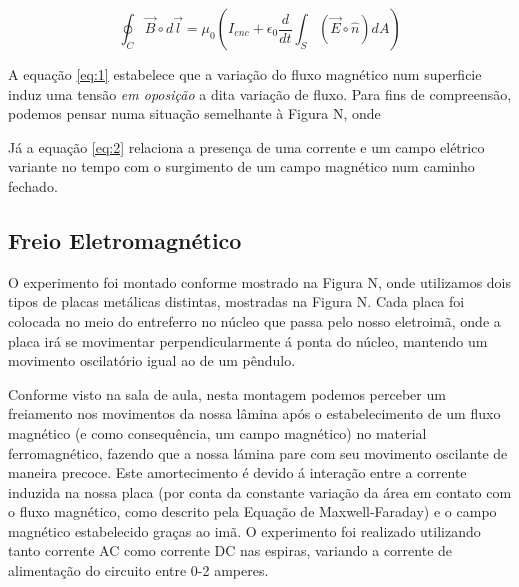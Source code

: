 \documentclass[12pt, a4paper, notitlepage]{article}
\begin{document}
        \begin{equation}\label{eq:2}
            \oint_{C}\vec{B}\circ d\vec{l} = \mu_0(I_{enc} + \epsilon_0 \frac{d}{dt}\int_{S}(\vec{E}\circ\hat{n})dA)
        \end{equation}
        
        A equação \ref{eq:1} estabelece que a variação do fluxo magnético num superficie induz uma tensão \textit{em oposição} a dita variação de fluxo. Para fins de compreensão, podemos pensar numa situação semelhante à Figura N, onde 
        
        Já a equação \ref{eq:2} relaciona a presença de uma corrente e um campo elétrico variante no tempo com o surgimento de um campo magnético num caminho fechado.
        
        
        
        
        
        \subsection{Freio Eletromagnético}
        
        
        O experimento foi montado conforme mostrado na Figura N, onde utilizamos dois tipos de placas metálicas distintas, mostradas na Figura N. Cada placa foi colocada no meio do entreferro no núcleo que passa pelo nosso eletroimã, onde a placa irá se movimentar perpendicularmente á ponta do núcleo, mantendo um movimento oscilatório igual ao de um pêndulo.
        
        
        Conforme visto na sala de aula, nesta montagem podemos perceber um freiamento nos movimentos da nossa lâmina após o estabelecimento de um fluxo magnético (e como consequência, um campo magnético) no material ferromagnético, fazendo que a nossa lámina pare com seu movimento oscilante de maneira precoce. Este amortecimento é devido á interação entre a corrente induzida na nossa placa (por conta da constante variação da área em contato com o fluxo magnético, como descrito pela Equação de Maxwell-Faraday) e o campo magnético estabelecido graças ao imã. O experimento foi realizado utilizando tanto corrente AC como corrente DC nas espiras, variando a corrente de alimentação do circuito entre 0-2 amperes.
        
\end{document}
